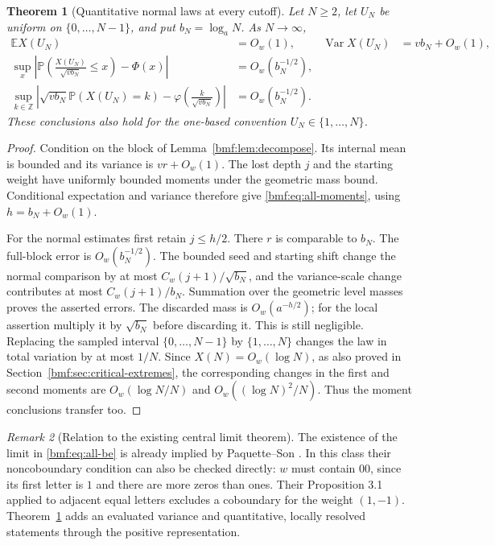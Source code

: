 \documentclass[11pt]{article}
\numberwithin{equation}{section}
\newtheorem{theorem}{Theorem}[section]
\theoremstyle{definition}
\theoremstyle{remark}
\newtheorem{remark}[theorem]{Remark}
\newcommand{\Z}{\mathbb{Z}}
\newcommand{\E}{\mathbb E}
\newcommand{\Prob}{\mathbb P}
\newcommand{\Var}{\operatorname{Var}}
\newcommand{\ph}{\varphi}
\begin{document}
\begin{theorem}[Quantitative normal laws at every cutoff]\label{bmf:thm:all-cutoff}
Let $N\geq2$, let $U_N$ be uniform on $\{0,\ldots,N-1\}$,
and put $b_N=\log_a N$. As $N\to\infty$,
\begin{align}
 \E X(U_N)&=O_w(1),&
 \Var X(U_N)&=vb_N+O_w(1),\label{bmf:eq:all-moments}\\
 \sup_x\left|
 \Prob\left(\frac{X(U_N)}{\sqrt{vb_N}}\leq x\right)-\Phi(x)
 \right|&=O_w(b_N^{-1/2}),\label{bmf:eq:all-be}\\
 \sup_{k\in\Z}\left|
 \sqrt{vb_N}\Prob(X(U_N)=k)
 -\ph\left(\frac{k}{\sqrt{vb_N}}\right)
 \right|&=O_w(b_N^{-1/2}).\label{bmf:eq:all-local}
\end{align}
These conclusions also hold for the one-based convention
$U_N\in\{1,\ldots,N\}$.
\end{theorem}
\begin{proof}
Condition on the block of Lemma~\ref{bmf:lem:decompose}.
Its internal mean is bounded and its variance is $vr+O_w(1)$.
The lost depth $j$ and the starting weight have uniformly bounded
moments under the geometric mass bound. Conditional expectation and
variance therefore give \eqref{bmf:eq:all-moments}, using
$h=b_N+O_w(1)$.

For the normal estimates first retain $j\leq h/2$.
There $r$ is comparable to $b_N$. The full-block error is
$O_w(b_N^{-1/2})$. The bounded seed and starting shift change the
normal comparison by at most $C_w(j+1)/\sqrt{b_N}$,
and the variance-scale change contributes at most
$C_w(j+1)/b_N$. Summation over the geometric level masses proves
the asserted errors. The discarded mass is $O_w(a^{-h/2})$;
for the local assertion multiply it by $\sqrt{b_N}$ before
discarding it. This is still negligible. Replacing the sampled
interval $\{0,\ldots,N-1\}$ by $\{1,\ldots,N\}$ changes the
law in total variation by at most $1/N$.
Since $X(N)=O_w(\log N)$, as also proved in
Section~\ref{bmf:sec:critical-extremes}, the corresponding changes
in the first and second moments are $O_w(\log N/N)$ and
$O_w((\log N)^2/N)$. Thus the moment conclusions transfer too.
\end{proof}

\begin{remark}[Relation to the existing central limit theorem]
The existence of the limit in \eqref{bmf:eq:all-be} is already implied
by Paquette--Son \cite[Theorem 3.3]{paquette}. In this class their
noncoboundary condition can also be checked directly: $w$ must
contain $00$, since its first letter is $1$ and there are more
zeros than ones. Their Proposition 3.1 applied to adjacent equal
letters excludes a coboundary for the weight $(1,-1)$.
Theorem~\ref{bmf:thm:all-cutoff} adds an evaluated variance and
quantitative, locally resolved statements through the positive
representation.
\end{remark}
\end{document}
